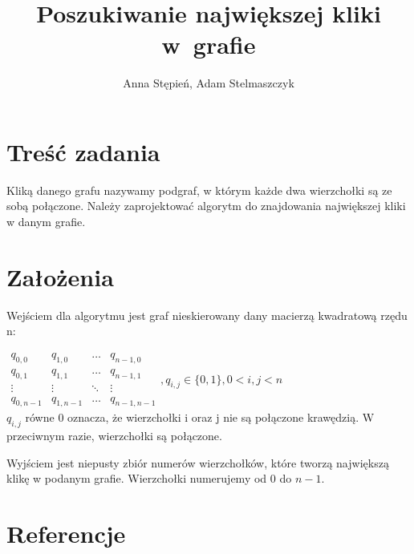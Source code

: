 \documentclass[12pt, a4paper]{article}
\title{\textbf{Poszukiwanie największej kliki w~grafie}}
\author{Anna Stępień, Adam Stelmaszczyk}
\date{}
\begin{document}
\maketitle

\section{Treść zadania}

Kliką danego grafu nazywamy podgraf, w którym każde dwa wierzchołki są ze sobą połączone. 
Należy zaprojektować algorytm do znajdowania największej kliki w danym grafie.

\section{Założenia}

Wejściem dla algorytmu jest graf nieskierowany dany macierzą kwadratową rzędu n: 

$ 
\begin{array}{cccc}

q_{0,0} & q_{1,0} & \ldots & q_{n-1,0} \\
q_{0,1} & q_{1,1} & \ldots & q_{n-1,1} \\
\vdots  & \vdots  & \ddots & \vdots  \\
q_{0,n-1} & q_{1,n-1} & \ldots & q_{n-1,n-1} 

\end{array}
, q_{i,j} \in \{0,1\}, 0 < i,j < n
$
\\
$q_{i,j}$ równe 0 oznacza, że wierzchołki i oraz j nie są połączone krawędzią. W przeciwnym razie, wierzchołki są połączone.

Wyjściem jest niepusty zbiór numerów wierzchołków, które tworzą największą klikę w podanym grafie.
Wierzchołki numerujemy od 0 do $n-1$.

\section{Referencje}
\end{document}
